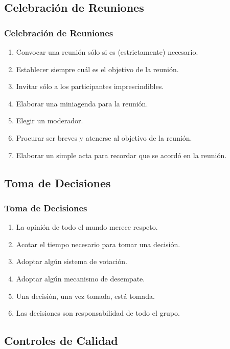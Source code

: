 \documentclass[a4paper,t,xcolor=pst,dvips]{beamer}
\begin{document}
\subsection{Celebración de Reuniones}

\begin{frame}[c]
	\frametitle{Celebración de Reuniones}
	\begin{enumerate}[<+->]
		\item Convocar una reunión sólo si es (estrictamente) necesario.
		\item Establecer siempre cuál es el objetivo de la reunión.
		\item Invitar sólo a los participantes imprescindibles. 
		\item Elaborar una miniagenda para la reunión.
		\item Elegir un moderador.
		\item Procurar ser breves y atenerse al objetivo de la reunión.
		\item Elaborar un simple acta para recordar que se acordó en la reunión.
	\end{enumerate}
\end{frame}

\subsection{Toma de Decisiones}

\begin{frame}[c]
	\frametitle{Toma de Decisiones}
	\begin{enumerate}[<+->]
		\item La opinión de todo el mundo merece respeto.
		\item Acotar el tiempo necesario para tomar una decisión.
		\item Adoptar algún sistema de votación.
		\item Adoptar algún mecanismo de desempate.
		\item Una decisión, una vez tomada, está tomada.
		\item Las decisiones son responsabilidad de todo el grupo.
	\end{enumerate}
\end{frame}

\subsection{Controles de Calidad}
\end{document}
